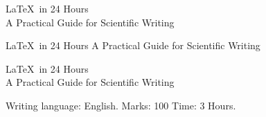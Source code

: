\documentclass[11pt,a4paper]{article}
\begin{document}
    \begin{center}
    \LaTeX\ in 24 Hours
    \vspace{8mm}\\
    A Practical Guide for Scientific Writing
    \end{center}

    \begin{center}
        \LaTeX\ in 24 Hours
        \vskip 8mm
        A Practical Guide for Scientific Writing
    \end{center}
    \begin{center}
        \LaTeX\ in 24 Hours
        \vspace{8mm}\\
        A Practical Guide for Scientific Writing
    \end{center}
    Writing language: \hspace{5mm} English.
    Marks: 100 \hfill Time: 3 Hours.
\end{document}
